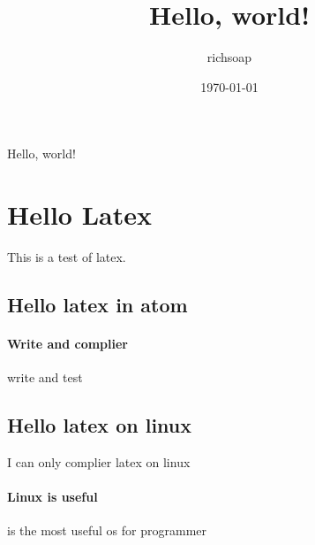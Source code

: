 \documentclass[UTF8]{ctexart}
\title{Hello, world!}
\author{richsoap}
\date{\today}
\begin{document}
\maketitle
Hello, world!
\section{Hello Latex}
This is a test of latex.
\subsection{Hello latex in atom}
\paragraph{Write and complier}
write and test
\subsection{Hello latex on linux}
I can only complier latex on linux
\paragraph{Linux is useful}
is the most useful os for programmer
\end{document}

